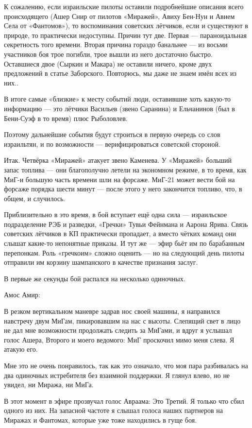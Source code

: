 К сожалению, если израильские пилоты оставили подробнейшие описания всего происходящего (Ашер Снир от пилотов «Миражей», Авиху Бен-Нун и Авием Села от «Фантомов»), то воспоминания советских лётчиков, если и существуют в природе, то практически недоступны. Причин тут две. Первая — параноидальная секретность того времени. Вторая причина гораздо банальнее — из восьми участников боя трое погибли, трое вышли из него достаточно быстро. Оставшиеся двое (Сыркин и Макара) не оставили ничего, кроме двух предложений в статье Заборского. Повторюсь, мы даже не знаем имён всех из них..

В итоге самые «близкие» к месту событий люди, оставившие хоть какую-то информацию — это лётчики Васильев (звено Саранина) и Ельчанинов (был в Бени-Суэф в то время) плюс Рыболовлев.

Поэтому дальнейшие события будут строиться в первую очередь со слов израильтян, и по возможности — верифицироваться советской стороной.

Итак. Четвёрка «Миражей» атакует звено Каменева. У «Миражей» больший запас топлива — они благополучно летели на экономном режиме, в то время, как МиГ-и большую часть времени шли на форсаже. МиГ-21 может вести бой на форсаже порядка шести минут — после этого у него закончится топливо, что, в общем, и случилось.

Приблизительно в это время, в бой вступает ещё одна сила — израильское подразделение РЭБ и разведки, «Гречки» Тувьи Фейнмана и Аарона Ярива. Связь советских лётчиков в КП практически пропадает, а вместо чётких команд они слышат какие-то непонятные приказы. И тут же — эфир бьёт им по барабанным перепонкам. Роль «гречкоим» сложно оценить — но на следующий день пилоты отправили им корзину шампанского в качестве признания заслуг.

В первые же секунды бой распался на несколько одиночных.

Амос Амир:

\begin{textcitation}
	В резком вертикальном маневре задрав нос своей машины, я направился навстречу двум МиГам, пикировавшим на нас с высоты. Слепящий свет в лицо не дал мне возможности продолжать следить за МиГами, и вдруг я услышал голос Ашера, Второго и моего ведомого: МиГ проскочил мимо меня слева. Я атакую его.
	
	Мне это не очень понравилось, так как это означало, что моя пара разбивалась на два одиночных истребителя без взаимной поддержки. Я глянул влево, но не увидел, ни Миража, ни МиГа.
	
	В этот момент в эфире прозвучал голос Авраама: Это Третий. Я только что сбил одного из них. На запасной частоте я слышал голоса наших партнеров на Миражах и Фантомах, которые уже тоже находились в гуще боя.
\end{textcitation}

